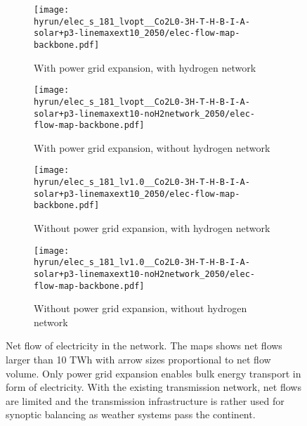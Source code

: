 \begin{figure}
    \begin{subfigure}{0.49\textwidth}
        \centering
        \caption{With power grid expansion, with hydrogen network}
        \texttt{[image: \\hyrun/elec\_s\_181\_lvopt\_\_Co2L0-3H-T-H-B-I-A-solar+p3-linemaxext10\_2050/elec-flow-map-backbone.pdf]}
    \end{subfigure}
    \begin{subfigure}{0.49\textwidth}
        \centering
        \caption{With power grid expansion, without hydrogen network}
        \texttt{[image: \\hyrun/elec\_s\_181\_lvopt\_\_Co2L0-3H-T-H-B-I-A-solar+p3-linemaxext10-noH2network\_2050/elec-flow-map-backbone.pdf]}
    \end{subfigure}
    \begin{subfigure}{0.49\textwidth}
        \centering
        \caption{Without power grid expansion, with hydrogen network}
        \texttt{[image: \\hyrun/elec\_s\_181\_lv1.0\_\_Co2L0-3H-T-H-B-I-A-solar+p3-linemaxext10\_2050/elec-flow-map-backbone.pdf]}
    \end{subfigure}
    \begin{subfigure}{0.49\textwidth}
        \centering
        \caption{Without power grid expansion, without hydrogen network}
        \texttt{[image: \\hyrun/elec\_s\_181\_lv1.0\_\_Co2L0-3H-T-H-B-I-A-solar+p3-linemaxext10-noH2network\_2050/elec-flow-map-backbone.pdf]}
    \end{subfigure}
    \caption{Net flow of electricity in the network. The maps shows net flows larger than 10 TWh with arrow sizes proportional to net flow volume. Only power grid expansion enables bulk energy transport in form of electricity. With the existing transmission network, net flows are limited and the transmission infrastructure is rather used for synoptic balancing as weather systems pass the continent.}
    \label{fig:si:flow-ac}
\end{figure}

